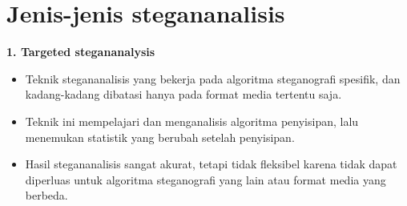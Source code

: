 \documentclass{article}
\begin{document}

\section*{Jenis-jenis stegananalisis}

\textbf{1. Targeted stegananalysis}
\begin{itemize}
    \item Teknik stegananalisis yang bekerja pada algoritma steganografi spesifik, dan kadang-kadang dibatasi hanya pada format media tertentu saja.
    \item Teknik ini mempelajari dan menganalisis algoritma penyisipan, lalu menemukan statistik yang berubah setelah penyisipan.
    \item Hasil stegananalisis sangat akurat, tetapi tidak fleksibel karena tidak dapat diperluas untuk algoritma steganografi yang lain atau format media yang berbeda.
\end{itemize}
\end{document}
